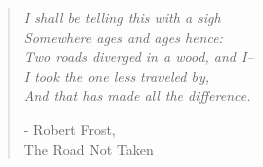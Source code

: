 \vspace{20mm}
\begin{quote}

\textit{I shall be telling this with a sigh \\
Somewhere ages and ages hence: \\
Two roads diverged in a wood, and I-- \\
I took the one less traveled by, \\
And that has made all the difference.
}

\vspace{-7mm}

\begin{flushright}
	- Robert Frost, \\ The Road Not Taken
\end{flushright}


\end{quote}
